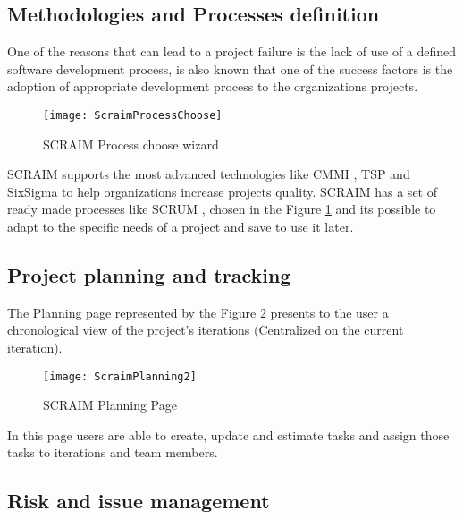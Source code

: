 \subsection{Methodologies and Processes definition}
One of the reasons that can lead to a project failure is the lack of use of a defined software development process, is also known that one of the success factors is the adoption of appropriate development process to the organizations projects.

\begin{figure}[h]
	\begin{center}
		\leavevmode
		\texttt{[image: ScraimProcessChoose]}
		\caption{SCRAIM Process choose wizard}
		\label{fig:scraimprocesschoose}
	\end{center}
\end{figure}

SCRAIM supports the most advanced technologies like CMMI \citep{Development2010}, TSP and SixSigma \citep{SixSigmaWeb} to help organizations increase projects quality.
SCRAIM has a set of ready made processes like SCRUM \citep{Pries2011}, chosen in the Figure \ref{fig:scraimprocesschoose} and its possible to adapt to the specific needs of a project and save to use it later.

\subsection{Project planning and tracking}

The Planning page represented by the Figure \ref{fig:scraimplanning} presents to the user a chronological view of the project's iterations (Centralized on the current iteration).

\begin{figure}[h]
	\begin{center}
		\leavevmode
		\texttt{[image: ScraimPlanning2]}
		\caption{SCRAIM Planning Page}
		\label{fig:scraimplanning}
	\end{center}
\end{figure}

In this page users are able to create, update and estimate tasks and assign those tasks to iterations and team members.


\subsection{Risk and issue management}

